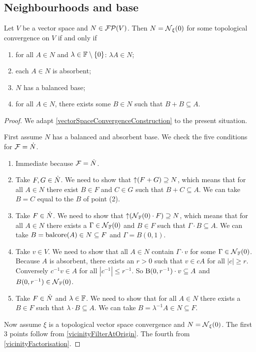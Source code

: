 \subsection{Neighbourhoods and base}
\begin{proposition} \label{TVSconstruction}
Let $V$ be a vector space and $N\in\operatorname{\mathcal{FP}}(V)$. Then $N = \operatorname{\mathcal{N}}_\xi(0)$ for some topological convergence on $V$ \textup{if and only if}
\begin{enumerate}
\item for all $A\in N$ and $\lambda\in \mathbb{F}\setminus\{0\}$: $\lambda A\in N$;
\item each $A \in N$ is absorbent;
\item $N$ has a balanced base;
\item for all $A\in N$, there exists some $B\in N$ such that $B+B\subseteq A$.
\end{enumerate}
\end{proposition}
\begin{proof}
We adapt \ref{vectorSpaceConvergenceConstruction} to the present situation.

First assume $N$ has a balanced and absorbent base. We check the five conditions for $\mathcal{F} = \dot{N}$.

\begin{enumerate}
\item Immediate because $\mathcal{F} = \dot{N}$.
\item Take $F,G\in \dot{N}$. We need to show that $\operatorname{\uparrow} (F + G) \supseteq N$, which means that for all $A \in N$ there exist $B\in F$ and $C\in G$ such that $B+C\subseteq A$. We can take $B = C$ equal to the $B$ of point (2).
\item Take $F\in \dot{N}$. We need to show that $\operatorname{\uparrow}(\operatorname{\mathcal{N}}_{\mathbb{F}}(0)\cdot F) \supseteq N$, which means that for all $A\in N$ there exists a $\Gamma\in \operatorname{\mathcal{N}}_{\mathbb{F}}(0)$ and $B\in F$ such that $\Gamma \cdot B\subseteq A$. We can take $B = \operatorname{balcore}(A) \in N \subseteq F$ and $\Gamma = B(0,1)$.
\item Take $v\in V$. We need to show that all $A\in N$ contain $\Gamma\cdot v$ for some $\Gamma \in \operatorname{\mathcal{N}}_{\mathbb{F}}(0)$. Because $A$ is absorbent, there exists an $r>0$ such that $v\in cA$ for all $|c|\geq r$. Conversely $c^{-1}v \in A$ for all $|c^{-1}| \leq r^{-1}$. So $\operatorname{B}(0,r^{-1})\cdot v \subseteq A$ and $B(0,r^{-1}) \in \operatorname{\mathcal{N}}_{\mathbb{F}}(0)$.
\item Take $F\in \dot{N}$ and $\lambda\in \mathbb{F}$. We need to show that for all $A\in N$ there exists a $B\in F$ such that $\lambda\cdot B\subseteq A$. We can take $B = \lambda^{-1}A \in N\subseteq F$.
\end{enumerate}

Now assume $\xi$ is a topological vector space convergence and $N = \operatorname{\mathcal{N}}_\xi(0)$. The first 3 points follow from \ref{vicinityFilterAtOrigin}. The fourth from \ref{vicinityFactorisation}.
\end{proof}
